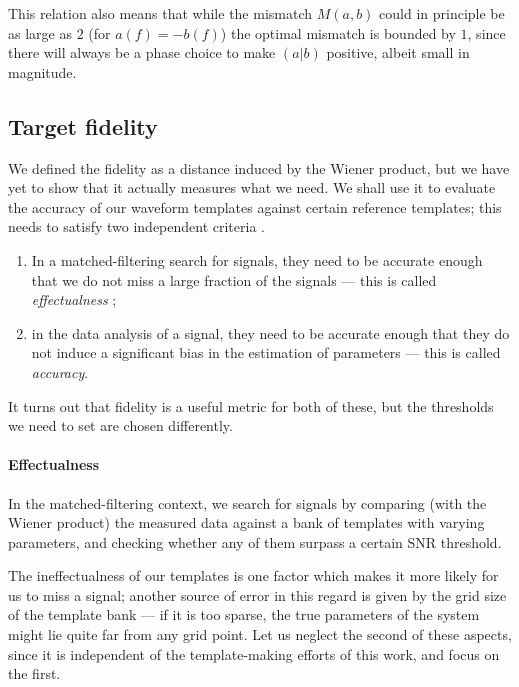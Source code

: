 \documentclass[main.tex]{subfiles}
\begin{document}
This relation also means that while the mismatch \(M(a, b)\) could in principle be as large as \(2\) (for \(a(f) = -b(f)\)) the optimal mismatch is bounded by \(1\), since there will always be a phase choice to make \((a|b)\) positive, albeit small in magnitude.


\subsection{Target fidelity} \label{sec:target-fidelity}

We defined the fidelity as a distance induced by the Wiener product, but we have yet to show that it actually measures what we need. 
We shall use it to evaluate the accuracy of our waveform templates against certain reference templates; this needs to satisfy two independent criteria \cite{lindblomModelWaveformAccuracy2008}.

\begin{enumerate}
    \item In a matched-filtering search for signals, they need to be accurate enough that we do not miss a large fraction of the signals --- this is called \emph{effectualness} \cite[]{damourAccuracyEffectualnessClosedform2011};
    \item in the data analysis of a signal, they need to be accurate enough that they do not induce a significant bias in the estimation of parameters --- this is called \emph{accuracy}.
\end{enumerate}

It turns out that fidelity is a useful metric for both of these, but the thresholds we need to set are chosen differently.

\paragraph{Effectualness}

In the matched-filtering context, we search for signals by comparing (with the Wiener product) the measured data against a bank of templates with varying parameters, and checking whether any of them surpass a certain \ac{SNR} threshold.

The ineffectualness of our templates is one factor which makes it more likely for us to miss a signal; another source of error in this regard is given by the grid size of the template bank --- if it is too sparse, the true parameters of the system might lie quite far from any grid point.
Let us neglect the second of these aspects, since it is independent of the template-making efforts of this work, and focus on the first. 
\end{document}
